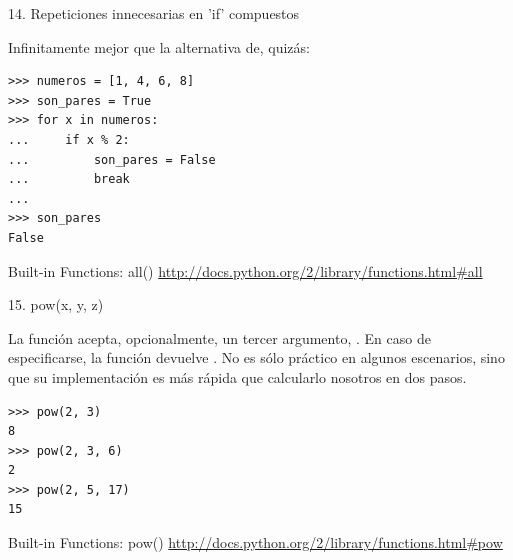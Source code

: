 \documentclass[14pt]{beamer}
\begin{document}
\begin{frame}[fragile]{14. \large Repeticiones innecesarias en 'if' compuestos}
  \begin{alertblock}{}
    \centering
    Infinitamente mejor que la alternativa de, quizás:
  \end{alertblock}

  \footnotesize
  \begin{exampleblock}{}
    \begin{lstlisting}
>>> numeros = [1, 4, 6, 8]
>>> son_pares = True
>>> for x in numeros:
...     if x % 2:
...         son_pares = False
...         break
...
>>> son_pares
False
    \end{lstlisting}
  \end{exampleblock}

  \small
  \begin{block}
    {\centering Built-in Functions: all()}
    \centering \url{http://docs.python.org/2/library/functions.html\#all}
  \end{block}
\end{frame}

\begin{frame}[fragile]{15. pow(x, y, z)}
  \small
  \begin{block}{}
    \centering
    La función  acepta, opcionalmente, un tercer
    argumento, . En caso de especificarse, la función
    devuelve .  No es sólo práctico en
    algunos escenarios, sino que su implementación es más rápida que
    calcularlo nosotros en dos pasos.
  \end{block}

  \footnotesize
  \begin{exampleblock}{}
    \begin{lstlisting}
>>> pow(2, 3)
8
>>> pow(2, 3, 6)
2
>>> pow(2, 5, 17)
15
    \end{lstlisting}
  \end{exampleblock}

  \small
  \begin{block}
    {\centering Built-in Functions: pow()}
    \centering \url{http://docs.python.org/2/library/functions.html\#pow}
  \end{block}
\end{frame}
\end{document}
